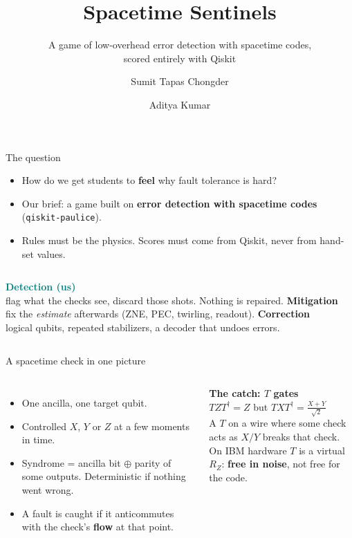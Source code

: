 \documentclass[aspectratio=169,11pt]{beamer}
\title{Spacetime Sentinels}
\subtitle{A game of low-overhead error detection with spacetime codes,\\ scored entirely with Qiskit}
\author{Sumit Tapas Chongder \and Aditya Kumar}
\institute{Department of CSE and Department of Physics, IIT Jodhpur\\[2pt]\small Qiskit Fall Fest 2026 Hackathon, Advanced track}
\date{}
\newcommand{\hl}[1]{\textcolor{acc}{\textbf{#1}}}
\begin{document}
\begin{frame}
\titlepage
\end{frame}

\begin{frame}{The question}
\begin{itemize}\setlength\itemsep{8pt}
  \item How do we get students to \hl{feel} why fault tolerance is hard?
  \item Our brief: a game built on \hl{error detection with spacetime codes} (\texttt{qiskit-paulice}).
  \item Rules must be the physics. Scores must come from Qiskit, never from hand-set values.
\end{itemize}
\vspace{10pt}
\begin{columns}[T]
\textbf{\textcolor{teal}{Detection (us)}}\\\small flag what the checks see, discard those shots. Nothing is repaired.
\textbf{Mitigation}\\\small fix the \emph{estimate} afterwards (ZNE, PEC, twirling, readout).
\textbf{Correction}\\\small logical qubits, repeated stabilizers, a decoder that undoes errors.
\end{columns}
\end{frame}

\begin{frame}{A spacetime check in one picture}
\begin{columns}[c]
\begin{itemize}\setlength\itemsep{6pt}
  \item One ancilla, one target qubit.
  \item Controlled $X$, $Y$ or $Z$ at a few moments in time.
  \item Syndrome = ancilla bit $\oplus$ parity of some outputs. Deterministic if nothing went wrong.
  \item A fault is caught if it anticommutes with the check's \hl{flow} at that point.
\end{itemize}
\textbf{The catch: $T$ gates}\\[4pt]
$TZT^\dagger = Z$ \quad but \quad $TXT^\dagger=\frac{X+Y}{\sqrt2}$\\[6pt]
A $T$ on a wire where some check acts as $X/Y$ \textcolor{bad}{breaks} that check.\\[6pt]
On IBM hardware $T$ is a virtual $R_Z$: \hl{free in noise}, not free for the code.
\end{columns}
\end{frame}
\end{document}
